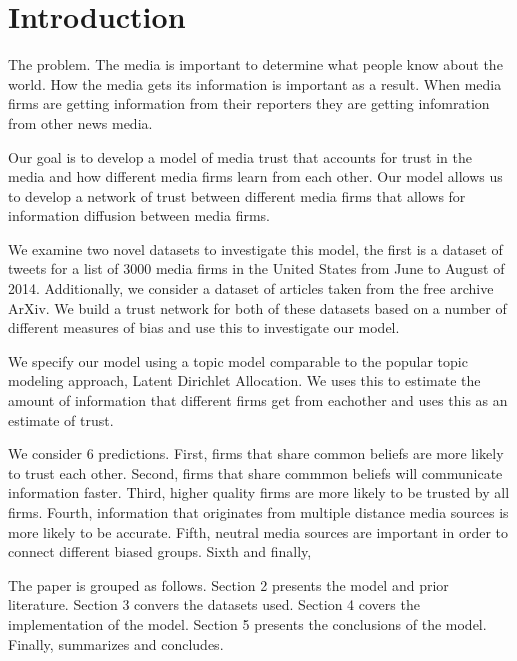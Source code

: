 \documentclass[a4paper, 12pt]{article}
\begin{document}
\clearpage
\thispagestyle{empty}

\section{Introduction}

The problem.  The media is important to determine what people know about the world.  How the media gets its information is important as a result.  When media firms are getting information from their reporters they are getting infomration from other news media.

Our goal is to develop a model of media trust that accounts for trust in the media and how different media firms learn from each other.  Our model allows us to develop a network of trust between different media firms that allows for information diffusion between media firms. 

We examine two novel datasets to investigate this model, the first is a dataset of tweets for a list of 3000 media firms in the United States from June to August of 2014.  Additionally, we consider a dataset of articles taken from the free archive ArXiv.  We build a trust network for both of these datasets based on a number of different measures of bias and use this to investigate our model.

We specify our model using a topic model comparable to the popular topic modeling approach, Latent Dirichlet Allocation.  We uses this to estimate the amount of information that different firms get from eachother and uses this as an estimate of trust.

We consider 6 predictions.  First, firms that share common beliefs are more likely to trust each other.  Second, firms that share commmon beliefs will communicate information faster.  Third, higher quality firms are more likely to be trusted by all firms.  Fourth, information that originates from multiple distance media sources is more likely to be accurate.  Fifth, neutral media sources are important in order to connect different biased groups.  Sixth and finally, 

The paper is grouped as follows.  Section 2 presents the model and prior literature.  Section 3 convers the datasets used.  Section 4 covers the implementation of the model.  Section 5 presents the conclusions of the model.  Finally, summarizes and concludes.
\end{document}
